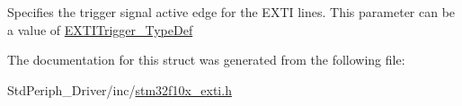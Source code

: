 Specifies the trigger signal active edge for the E\+X\+TI lines. This parameter can be a value of \mbox{\hyperlink{group___e_x_t_i___exported___types_ga9da190f5425d1b421a06bced8cc48e9b}{E\+X\+T\+I\+Trigger\+\_\+\+Type\+Def}} 

The documentation for this struct was generated from the following file\+:\begin{DoxyCompactItemize}
\item 
Std\+Periph\+\_\+\+Driver/inc/\mbox{\hyperlink{stm32f10x__exti_8h}{stm32f10x\+\_\+exti.\+h}}\end{DoxyCompactItemize}

